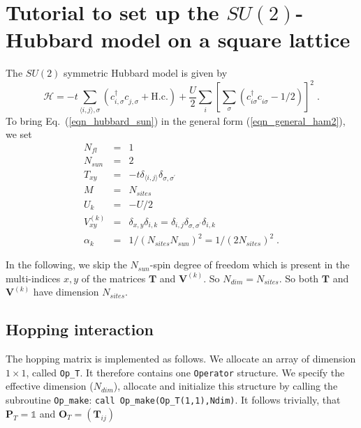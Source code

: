\section{Tutorial to set up the $SU(2)$-Hubbard model on a square lattice}
The $SU(2)$ symmetric Hubbard model is given by
\begin{equation}
\label{eqn_hubbard_sun}
\mathcal{H}=
-t\sum\limits_{\langle i,j\rangle,\sigma} 
\left(c^{\dagger}_{i,\sigma} c^{\phantom\dagger}_{j,\sigma} + \text{H.c.}
\right)
+ \frac{U}{2}\sum\limits_{i}\left[
\sum\limits_{\sigma}
\left(  c^{\dagger}_{i\sigma} c^{\phantom\dagger}_{i\sigma}  -1/2 \right) \right]^{2}\;.
\end{equation}
To bring Eq.~(\ref{eqn_hubbard_sun}) in the general form (\ref{eqn_general_ham2}), we set
\begin{eqnarray}
N_{fl}&=&1\nonumber\\
N_{sun}&=&2\nonumber\\
T_{x y}&=&-t\delta_{\langle i,j\rangle}\delta_{\sigma,\sigma^{\prime}}\nonumber\\
M&=&N_{sites}\nonumber\\
U_{k}&=&-U/2\nonumber\\
V_{x y}^{(k)}&=&
\delta_{x,y}\delta_{i,k}=
\delta_{i,j}\delta_{\sigma,\sigma^{\prime}}\delta_{i,k}\nonumber\\
\alpha_{k}&=&1/(N_{sites}N_{sun})^{2}=1/(2 N_{sites})^{2}\;.
\end{eqnarray}

In the following, we skip the $N_{sun}$-spin degree of freedom which is present in the multi-indices $x,y$ of the matrices $\bm{T}$ and ${\bm V}^{(k)}$. 
So $N_{dim}=N_{sites}$. 
So both $\bm{T}$ and ${\bm V}^{(k)}$  have dimension $N_{sites}$.

\subsection{Hopping interaction}
The hopping matrix is implemented as follows. 
We allocate an array of dimension $1\times 1$, called \texttt{Op\_T}. It therefore contains one \texttt{Operator} structure.
We specify the effective dimension ($N_{dim}$), allocate and initialize this structure by calling the subroutine \texttt{Op\_make}: \texttt{call Op\_make(Op\_T(1,1),Ndim)}.
It follows trivially, that ${\bm P}_{T}=\mathds{1}$ and ${\bm O}_{T}=({\bm T}_{ij})$ 


